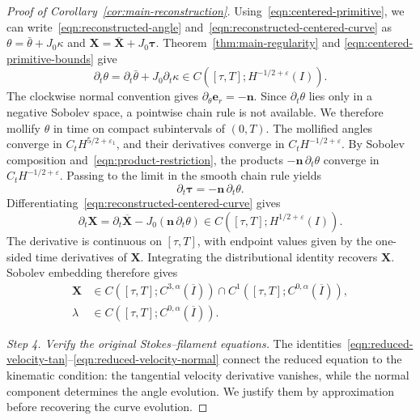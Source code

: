 \documentclass[11pt,reqno]{amsart}
\theoremstyle{plain}
\theoremstyle{definition}
\numberwithin{equation}{section}
\newcommand{\paren}[1]{\left(#1\right)}
\newcommand{\p}{\partial}
\newcommand{\bm}[1]{\boldsymbol{#1}}
\begin{document}
\begin{proof}[Proof of Corollary~\ref{cor:main-reconstruction}]
Using~\eqref{eqn:centered-primitive}, we can write~\eqref{eqn:reconstructed-angle} and~\eqref{eqn:reconstructed-centered-curve} as
$\theta=\bar\theta+J_0\kappa$ and
$\bm X=\overline{\bm X}+J_0\bm\tau$.
Theorem~\ref{thm:main-regularity} and
\eqref{eqn:centered-primitive-bounds} give
\begin{equation}\label{eqn:reconstruction-angle-time}
    \p_t\theta=\p_t\bar\theta+J_0\p_t\kappa
    \in C\paren{[\tau,T];H^{-1/2+\varepsilon}(I)}.
\end{equation}
The clockwise normal convention gives $\p_\theta\bm e_r=-\bm n$.
Since $\p_t\theta$ lies only in a negative Sobolev space, a pointwise
chain rule is not available. We therefore mollify $\theta$ in time on
compact subintervals of $(0,T)$. The mollified angles converge in
$C_tH^{5/2+\varepsilon_1}$, and their derivatives converge in
$C_tH^{-1/2+\varepsilon}$. By Sobolev composition and~\eqref{eqn:product-restriction}, the products $-\bm n\,\p_t\theta$ converge in
$C_tH^{-1/2+\varepsilon}$.
Passing to the limit in the smooth chain rule yields
\begin{equation}\label{eqn:tangent-time-chain-rule}
    \p_t\bm\tau=-\bm n\,\p_t\theta.
\end{equation}
Differentiating~\eqref{eqn:reconstructed-centered-curve} gives
\begin{equation}\label{eqn:reconstruction-curve-time}
    \p_t\bm X
    =\p_t\overline{\bm X}-J_0(\bm n\,\p_t\theta)
    \in C\paren{[\tau,T];H^{1/2+\varepsilon}(I)}.
\end{equation}
The derivative is continuous on $[\tau,T]$, with endpoint values given
by the one-sided time derivatives of $\bm X$. Integrating the
distributional identity recovers $\bm X$.
Sobolev embedding therefore gives
\begin{equation}\label{eqn:main-physical-regularity}
\begin{aligned}
    \bm X&\in C\paren{[\tau,T];C^{3,\alpha}(\overline I)}
        \cap C^1\paren{[\tau,T];C^{0,\alpha}(\overline I)},\\
    \lambda&\in C\paren{[\tau,T];C^{0,\alpha}(\overline I)}.
\end{aligned}
\end{equation}

\emph{Step 4. Verify the original Stokes--filament equations.}
The identities~\eqref{eqn:reduced-velocity-tan}--\eqref{eqn:reduced-velocity-normal}
connect the reduced equation to the kinematic condition: the tangential
velocity derivative vanishes, while the normal component determines
the angle evolution. We justify them by approximation before recovering
the curve evolution.


\end{proof}
\end{document}

